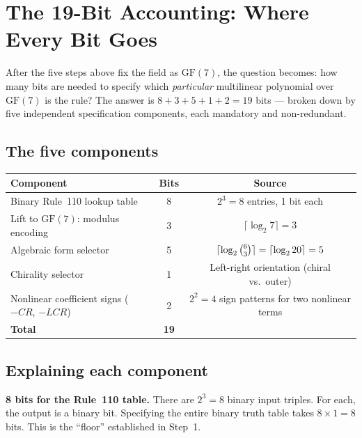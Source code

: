 \documentclass[11pt,a4paper]{article}
\theoremstyle{definition}
\begin{document}
\section{The 19-Bit Accounting: Where Every Bit Goes}
\label{sec:19bits}

\begin{tcolorbox}[colback=boxyellow,colframe=orange!50!black,
  title={Why exactly 19?}]
After the five steps above fix the field as $\mathrm{GF}(7)$, the question
becomes: how many bits are needed to specify which \emph{particular}
multilinear polynomial over $\mathrm{GF}(7)$ is the rule?  The answer is
$8 + 3 + 5 + 1 + 2 = 19$ bits — broken down by five independent
specification components, each mandatory and non-redundant.
\end{tcolorbox}

\subsection{The five components}

\begin{center}
\begin{tabular}{@{}p{7cm}cc@{}}
\toprule
\textbf{Component} & \textbf{Bits} & \textbf{Source} \\
\midrule
Binary Rule~110 lookup table
  & 8 & $2^3 = 8$ entries, 1 bit each \\
Lift to $\mathrm{GF}(7)$: modulus encoding
  & 3 & $\lceil\log_2 7\rceil = 3$ \\
Algebraic form selector
  & 5 & $\lceil\log_2\tbinom{6}{3}\rceil = \lceil\log_2 20\rceil = 5$ \\
Chirality selector
  & 1 & Left-right orientation (chiral vs.\ outer) \\
Nonlinear coefficient signs ($-CR$, $-LCR$)
  & 2 & $2^2 = 4$ sign patterns for two nonlinear terms \\
\midrule
\textbf{Total} & \textbf{19} & \\
\bottomrule
\end{tabular}
\end{center}

\subsection{Explaining each component}

\textbf{8 bits for the Rule~110 table.}
There are $2^3 = 8$ binary input triples.  For each, the output is a
binary bit.  Specifying the entire binary truth table takes $8 \times 1 = 8$
bits.  This is the ``floor'' established in Step~1.
\end{document}
